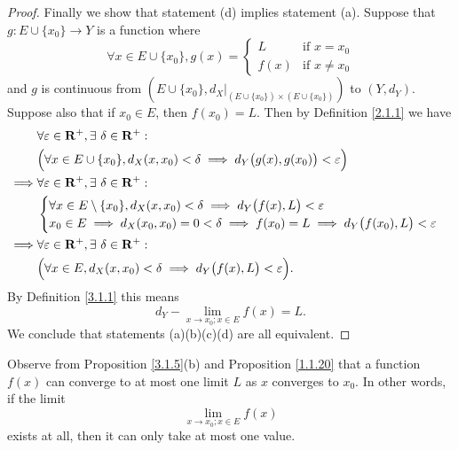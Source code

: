 \begin{proof}
    Finally we show that statement (d) implies statement (a).
    Suppose that \(g : E \cup \{x_0\} \to Y\) is a function where
    \[
        \forall x \in E \cup \{x_0\}, g(x) = \begin{cases}
            L    & \text{if } x = x_0    \\
            f(x) & \text{if } x \neq x_0
        \end{cases}
    \]
    and \(g\) is continuous from \((E \cup \{x_0\}, d_X|_{(E \cup \{x_0\}) \times (E \cup \{x_0\})})\) to \((Y, d_Y)\).
    Suppose also that if \(x_0 \in E\), then \(f(x_0) = L\).
    Then by Definition \ref{2.1.1} we have
    \begin{align*}
                 & \forall \varepsilon \in \mathbf{R}^+, \exists\ \delta \in \mathbf{R}^+ :                                                       \\
                 & \Big(\forall x \in E \cup \{x_0\}, d_X(x, x_0) < \delta \implies d_Y\big(g(x), g(x_0)\big) < \varepsilon\Big)  \\
        \implies & \forall \varepsilon \in \mathbf{R}^+, \exists\ \delta \in \mathbf{R}^+ :                                                       \\
                 & \begin{cases}
                       \forall x \in E \setminus \{x_0\}, d_X(x, x_0) < \delta \implies d_Y\big(f(x), L\big) < \varepsilon \\
                       x_0 \in E \implies d_X(x_0, x_0) = 0 < \delta \implies f(x_0) = L \implies d_Y\big(f(x_0), L\big) < \varepsilon
                   \end{cases} \\
        \implies & \forall \varepsilon \in \mathbf{R}^+, \exists\ \delta \in \mathbf{R}^+ :                                                       \\
                 & \Big(\forall x \in E, d_X(x, x_0) < \delta \implies d_Y\big(f(x), L\big) < \varepsilon\Big).
    \end{align*}
    By Definition \ref{3.1.1} this means
    \[
        d_Y - \lim_{x \to x_0 ; x \in E} f(x) = L.
    \]
    We conclude that statements (a)(b)(c)(d) are all equivalent.
\end{proof}

\begin{remark}\label{3.1.6}
    Observe from Proposition \ref{3.1.5}(b) and Proposition \ref{1.1.20} that a function \(f(x)\) can converge to at most one limit \(L\) as \(x\) converges to \(x_0\).
    In other words, if the limit
    \[
        \lim_{x \to x_0 ; x \in E} f(x)
    \]
    exists at all, then it can only take at most one value.
\end{remark}

